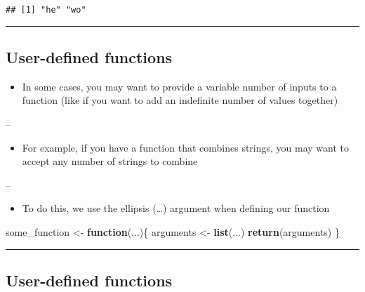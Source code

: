 \documentclass[]{article}
\newenvironment{Shaded}{\begin{snugshade}}{\end{snugshade}}
\newcommand{\ControlFlowTok}[1]{\textcolor[rgb]{0.13,0.29,0.53}{\textbf{#1}}}
\newcommand{\KeywordTok}[1]{\textcolor[rgb]{0.13,0.29,0.53}{\textbf{#1}}}
\newcommand{\NormalTok}[1]{#1}
\newcommand{\StringTok}[1]{\textcolor[rgb]{0.31,0.60,0.02}{#1}}
\providecommand{\tightlist}{%
  \setlength{\itemsep}{0pt}\setlength{\parskip}{0pt}}
\begin{document}
\begin{verbatim}
## [1] "he" "wo"
\end{verbatim}

\begin{center}\rule{0.5\linewidth}{\linethickness}\end{center}

\hypertarget{user-defined-functions}{%
\subsection{User-defined functions}\label{user-defined-functions}}

\begin{itemize}
\tightlist
\item
  In some cases, you may want to provide a variable number of inputs to
  a function (like if you want to add an indefinite number of values
  together)
\end{itemize}

--

\begin{itemize}
\tightlist
\item
  For example, if you have a function that combines strings, you may
  want to accept any number of strings to combine
\end{itemize}

--

\begin{itemize}
\tightlist
\item
  To do this, we use the ellipsis (\ldots) argument when defining our
  function
\end{itemize}

\begin{Shaded}
\begin{Highlighting}[]
\NormalTok{some_function <-}\StringTok{ }\ControlFlowTok{function}\NormalTok{(...)\{}
\NormalTok{  arguments <-}\StringTok{ }\KeywordTok{list}\NormalTok{(...)}
  \KeywordTok{return}\NormalTok{(arguments)}
\NormalTok{\}}
\end{Highlighting}
\end{Shaded}

\begin{center}\rule{0.5\linewidth}{\linethickness}\end{center}

\hypertarget{user-defined-functions-1}{%
\subsection{User-defined functions}\label{user-defined-functions-1}}
\end{document}
